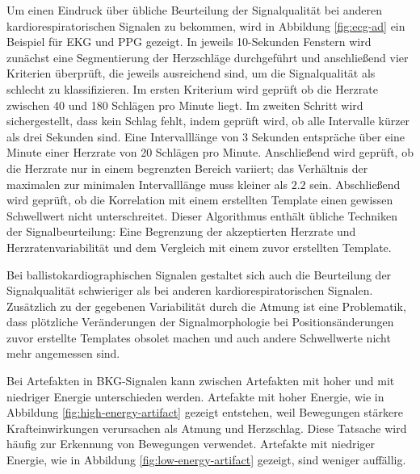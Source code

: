 	Um einen Eindruck über übliche Beurteilung der Signalqualität bei anderen kardiorespiratorischen Signalen zu bekommen, wird in Abbildung \ref{fig:ecg-ad} ein Beispiel für \ac{EKG} und \ac{PPG} gezeigt. In jeweils 10-Sekunden Fenstern wird zunächst eine Segmentierung der Herzschläge durchgeführt und anschließend vier Kriterien überprüft, die jeweils ausreichend sind, um die Signalqualität als schlecht zu klassifizieren. Im ersten Kriterium wird geprüft ob die Herzrate zwischen 40 und 180 Schlägen pro Minute liegt. Im zweiten Schritt wird sichergestellt, dass kein Schlag fehlt, indem geprüft wird, ob alle Intervalle kürzer als drei Sekunden sind. Eine Intervalllänge von 3 Sekunden entspräche über eine Minute einer Herzrate von 20 Schlägen pro Minute. Anschließend wird geprüft, ob die Herzrate nur in einem begrenzten Bereich variiert; das Verhältnis der maximalen zur minimalen Intervalllänge muss kleiner als $2.2$ sein. Abschließend wird geprüft, ob die Korrelation mit einem erstellten Template einen gewissen Schwellwert nicht unterschreitet. Dieser Algorithmus enthält übliche Techniken der Signalbeurteilung: Eine Begrenzung der akzeptierten Herzrate und Herzratenvariabilität und dem Vergleich mit einem zuvor erstellten Template.
	
	Bei ballistokardiographischen Signalen gestaltet sich auch die Beurteilung der Signalqualität schwieriger als bei anderen kardiorespiratorischen Signalen. Zusätzlich zu der gegebenen Variabilität durch die Atmung ist eine Problematik, dass plötzliche Veränderungen der Signalmorphologie bei Positionsänderungen zuvor erstellte Templates obsolet machen und auch andere Schwellwerte nicht mehr angemessen sind.
	
	Bei Artefakten in \ac{BKG}-Signalen kann zwischen Artefakten mit hoher und mit niedriger Energie unterschieden werden. Artefakte mit hoher Energie, wie in Abbildung \ref{fig:high-energy-artifact} gezeigt entstehen, weil Bewegungen stärkere Krafteinwirkungen verursachen als Atmung und Herzschlag. Diese Tatsache wird häufig zur Erkennung von Bewegungen verwendet. Artefakte mit niedriger Energie, wie in Abbildung \ref{fig:low-energy-artifact} gezeigt, sind weniger auffällig.
	
